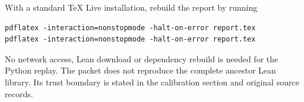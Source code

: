 With a standard TeX Live installation, rebuild the report by running
\begin{lstlisting}
pdflatex -interaction=nonstopmode -halt-on-error report.tex
pdflatex -interaction=nonstopmode -halt-on-error report.tex
\end{lstlisting}
No network access, Lean download or dependency rebuild is needed for the Python replay. The packet does not reproduce the complete ancestor Lean library. Its trust boundary is stated in the calibration section and original source records.
